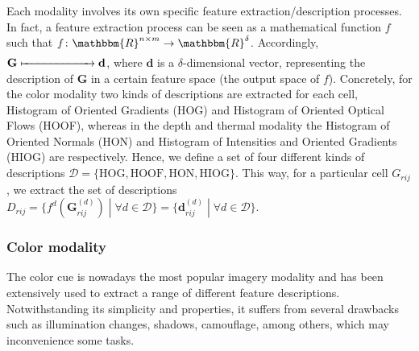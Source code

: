 \documentclass[10pt,twocolumn,letterpaper]{article}
\begin{document}

Each modality involves its own specific feature extraction/description processes. In fact, a feature extraction process can be seen as a mathematical function $f$ such that $f \colon \mathbbm{R}^{n \times m} \to \mathbbm{R}^\delta$. Accordingly, $\mathbf{G} \xmapsto{\phantom{\mathbbm{R}^{n \times m}}} \mathbf{d}$, where $\mathbf{d}$ is a $\delta$-dimensional vector, representing the description of $\mathbf{G}$ in a certain feature space (the output space of $f$). Concretely, for the color modality two kinds of descriptions are extracted for each cell, Histogram of Oriented Gradients (HOG) and Histogram of Oriented Optical Flows (HOOF), whereas in the depth and thermal modality the Histogram of Oriented Normals (HON) and Histogram of Intensities and Oriented Gradients (HIOG) are respectively. Hence, we define a set of four different kinds of descriptions $\mathcal{D} = \{\mathrm{HOG}, \mathrm{HOOF}, \mathrm{HON}, \mathrm{HIOG}\}$. This way, for a particular cell $G_{rij}$, we extract the set of descriptions $D_{rij} = \{f^d(\mathbf{G}_{rij}^{(d)}) \;|\; \forall d \in \mathcal{D}\} = \{\mathbf{d}_{rij}^{(d)} \;|\; \forall d \in \mathcal{D}\}$.

\subsubsection{Color modality}
\label{sssec:color}

The color cue is nowadays the most popular imagery modality and has been extensively used to extract a range of different feature descriptions. Notwithstanding its simplicity and properties, it suffers from several drawbacks such as illumination changes, shadows, camouflage, among others, which may inconvenience some tasks.
\end{document}
